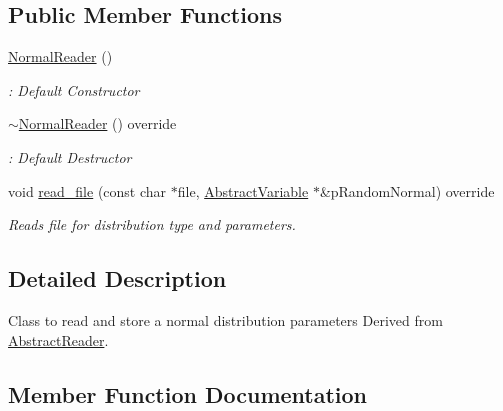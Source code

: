 \subsection*{Public Member Functions}
\begin{DoxyCompactItemize}
\item 
\mbox{\label{classNormalReader_a21910e5b630b535ac9e8a9b55bcb4d06}} 
\hyperlink{classNormalReader_a21910e5b630b535ac9e8a9b55bcb4d06}{Normal\+Reader} ()
\begin{DoxyCompactList}\small\item\em \+: Default Constructor \end{DoxyCompactList}\item 
\mbox{\label{classNormalReader_a028e517f19b788a043ba170a3bbe24ab}} 
\hyperlink{classNormalReader_a028e517f19b788a043ba170a3bbe24ab}{$\sim$\+Normal\+Reader} () override
\begin{DoxyCompactList}\small\item\em \+: Default Destructor \end{DoxyCompactList}\item 
void \hyperlink{classNormalReader_ae6571e3fdc414f143a5541807eded6e0}{read\+\_\+file} (const char $\ast$file, \hyperlink{classAbstractVariable}{Abstract\+Variable} $\ast$\&p\+Random\+Normal) override
\begin{DoxyCompactList}\small\item\em Reads file for distribution type and parameters. \end{DoxyCompactList}\end{DoxyCompactItemize}


\subsection{Detailed Description}
Class to read and store a normal distribution parameters Derived from \hyperlink{classAbstractReader}{Abstract\+Reader}. 

\subsection{Member Function Documentation}
\mbox{\label{classNormalReader_ae6571e3fdc414f143a5541807eded6e0}} 
